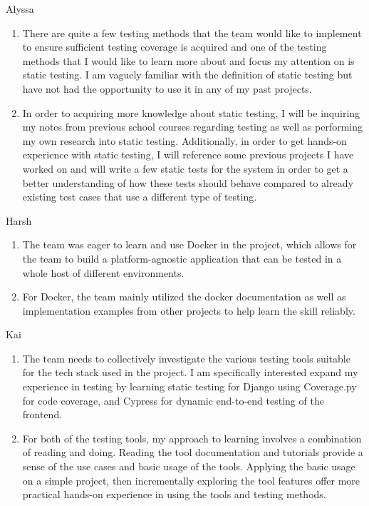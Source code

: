 \documentclass[12pt, titlepage]{article}
\begin{document}
Alyssa
\begin{enumerate}
    \item There are quite a few testing methods that the team would like to implement to ensure sufficient testing coverage is acquired and one of the testing methods that I would like to learn more about and focus my attention on is static testing. I am vaguely familiar with the definition of static testing but have not had the opportunity to use it in any of my past projects.
    \item In order to acquiring more knowledge about static testing, I will be inquiring my notes from previous school courses regarding testing as well as performing my own research into static testing. Additionally, in order to get hands-on experience with static testing, I will reference some previous projects I have worked on and will write a few static tests for the system in order to get a better understanding of how these tests should behave compared to already existing test cases that use a different type of testing.
\end{enumerate}

Harsh
\begin{enumerate}
    \item The team was eager to learn and use Docker in the project, which allows for the team to build a platform-agnostic application that can be tested in a whole host of different environments.
    \item For Docker, the team mainly utilized the docker documentation as well as implementation examples from other projects to help learn the skill reliably.
\end{enumerate}

Kai
\begin{enumerate}
    \item The team needs to collectively investigate the various testing tools suitable for the tech stack used in the project. I am specifically interested expand my experience in testing by learning static testing for Django using Coverage.py for code coverage, and Cypress for dynamic end-to-end testing of the frontend.
    
    \item For both of the testing tools, my approach to learning involves a combination of reading and doing. Reading the tool documentation and tutorials provide a sense of the use cases and basic usage of the tools. Applying the basic usage on a simple project, then incrementally exploring the tool features offer more practical hands-on experience in using the tools and testing methods.
\end{enumerate}
\end{document}
